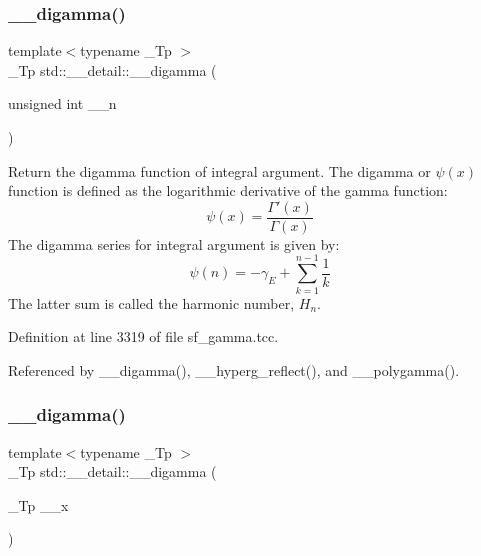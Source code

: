 \mbox{\label{namespacestd_1_1____detail_a8ae60de1f8adf628c0b7f243231b98c3}} 
\subsubsection{\texorpdfstring{\+\_\+\+\_\+digamma()}{\_\_digamma()}\hspace{0.1cm}{\footnotesize\ttfamily [1/2]}}
{\footnotesize\ttfamily template$<$typename \+\_\+\+Tp $>$ \\
\+\_\+\+Tp std\+::\+\_\+\+\_\+detail\+::\+\_\+\+\_\+digamma (\begin{DoxyParamCaption}\item[{unsigned int}]{\+\_\+\+\_\+n }\end{DoxyParamCaption})}



Return the digamma function of integral argument. The digamma or $ \psi(x) $ function is defined as the logarithmic derivative of the gamma function\+: \[ \psi(x) = \frac{\Gamma'(x)}{\Gamma(x)} \] The digamma series for integral argument is given by\+: \[ \psi(n) = -\gamma_E + \sum_{k=1}^{n-1} \frac{1}{k} \] The latter sum is called the harmonic number, $ H_n $. 



Definition at line 3319 of file sf\+\_\+gamma.\+tcc.



Referenced by \+\_\+\+\_\+digamma(), \+\_\+\+\_\+hyperg\+\_\+reflect(), and \+\_\+\+\_\+polygamma().

\mbox{\label{namespacestd_1_1____detail_af83cdc6dd8c24e164b8c71491c4b0080}} 
\subsubsection{\texorpdfstring{\+\_\+\+\_\+digamma()}{\_\_digamma()}\hspace{0.1cm}{\footnotesize\ttfamily [2/2]}}
{\footnotesize\ttfamily template$<$typename \+\_\+\+Tp $>$ \\
\+\_\+\+Tp std\+::\+\_\+\+\_\+detail\+::\+\_\+\+\_\+digamma (\begin{DoxyParamCaption}\item[{\+\_\+\+Tp}]{\+\_\+\+\_\+x }\end{DoxyParamCaption})}



